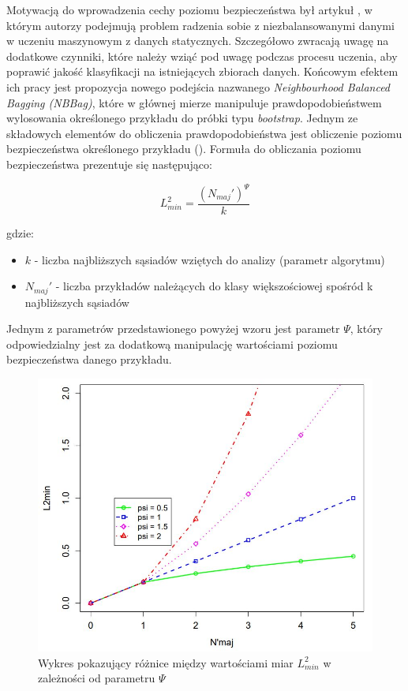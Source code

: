 Motywacją do wprowadzenia cechy poziomu bezpieczeństwa był artykuł \cite{Article:NNBag}, w którym autorzy podejmują problem radzenia sobie z niezbalansowanymi danymi w uczeniu maszynowym z danych statycznych. Szczegółowo zwracają uwagę na dodatkowe czynniki, które należy wziąć pod uwagę podczas procesu uczenia, aby poprawić jakość klasyfikacji na istniejących zbiorach danych. Końcowym efektem ich pracy jest propozycja nowego podejścia nazwanego \textit{Neighbourhood Balanced Bagging (NBBag)}, które w głównej mierze manipuluje prawdopodobieństwem wylosowania określonego przykładu do próbki typu \textit{bootstrap}. Jednym ze składowych elementów do obliczenia prawdopodobieństwa jest obliczenie poziomu bezpieczeństwa określonego przykładu (). Formuła do obliczania poziomu bezpieczeństwa prezentuje się następująco:

\begin{equation}
    L^2_{min} = \frac{(N_{maj}')^\Psi}{k}
\end{equation}

\noindent gdzie:

\begin{itemize}
    \item $k$ - liczba najbliższych sąsiadów wziętych do analizy (parametr algorytmu)
    \item $N_{maj}'$ - liczba przykładów należących do klasy większościowej spośród k najbliższych sąsiadów
\end{itemize}

\noindent Jednym z parametrów przedstawionego powyżej wzoru jest parametr $\Psi$, który odpowiedzialny jest za dodatkową manipulację wartościami poziomu bezpieczeństwa danego przykładu.

\begin{figure}[h]
    \centering
    \includegraphics[width=13cm]{figures/psi_coeff.JPG}
    \caption{Wykres pokazujący różnice między wartościami miar $L^2_{min}$ w zależności od parametru $\Psi$ \cite{Article:NNBag}}\label{Figure:PsiCoefficient}
\end{figure}

